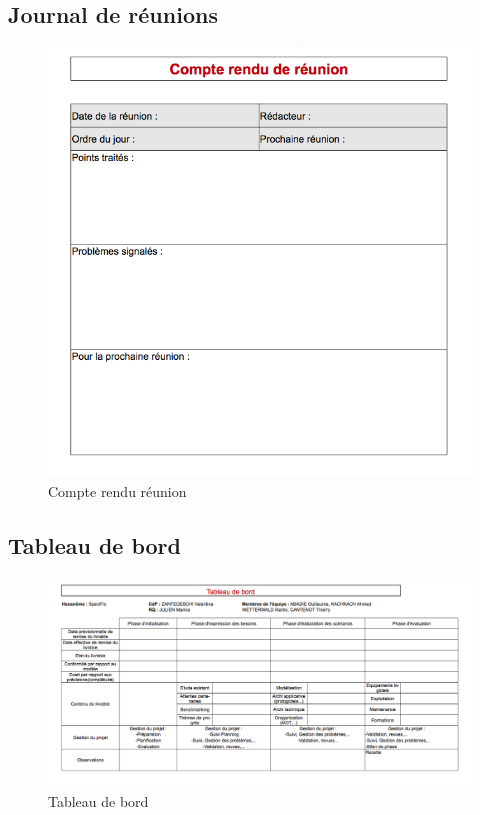 \subsection{Journal de réunions}
\begin{figure}[h]
    \centering
    \includegraphics[width=140mm]{images/compte_rendu_reunion.png}
    \caption{Compte rendu réunion}
\end{figure}
\subsection{Tableau de bord}
\begin{figure}[h]
    \centering
    \includegraphics[width=140mm]{images/dashboard.png}
    \caption{Tableau de bord}
\end{figure}
